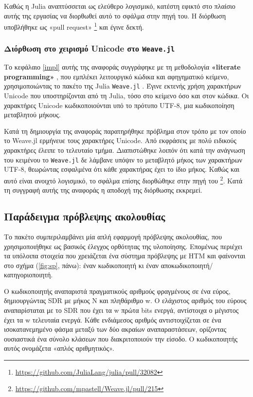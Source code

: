 	Καθώς η Julia αναπτύσσεται ως ελεύθερο λογισμικό, κατέστη εφικτό στο πλαίσιο αυτής της εργασίας να διορθωθεί αυτό το σφάλμα στην πηγή του.
	Η διόρθωση υποβλήθηκε ως «pull request» \footnote{\url{https://github.com/JuliaLang/julia/pull/32082}} και έγινε δεκτή.

	\subsubsection{Διόρθωση στο χειρισμό Unicode στο \texttt{Weave.jl}}

	Το κεφάλαιο \ref{impl} αυτής της αναφοράς συγγράφηκε με τη μεθοδολογία \textbf{«literate programming»} \parencite{knuthLiterateProgramming1984},
	που εμπλέκει λειτουργικό κώδικα και αφηγηματικό κείμενο,
	χρησιμοποιώντας το πακέτο της Julia \texttt{Weave.jl} \cite{pastellWeaveJlScientific2017}.
	Έγινε εκτενής χρήση χαρακτήρων Unicode που υποστηρίζονται από τη Julia, τόσο στο κείμενο όσο και στον κώδικα.
	Οι χαρακτήρες Unicode κωδικοποιούνται υπό το πρότυπο UTF-8, μια κωδικοποίηση μεταβλητού μήκους.

	Κατά τη δημιουργία της αναφοράς παρατηρήθηκε πρόβλημα στον τρόπο με τον οποίο το Weave.jl ερμήνευε τους χαρακτήρες Unicode.
	Από εκφράσεις με πολύ ειδικούς χαρακτήρες έλειπε το τελευταίο τμήμα.
	Διαπιστώθηκε λοιπόν ότι κατά την ανάγνωση του κειμένου το \texttt{Weave.jl} δε λάμβανε υπόψιν το μεταβλητό μήκος των χαρακτήρων UTF-8,
	θεωρώντας εσφαλμένα ότι κάθε χαρακτήρας έχει το ίδιο μήκος.
	Καθώς και αυτό είναι ανοιχτό λογισμικό, το σφάλμα επίσης διορθώθηκε στην πηγή του
	\footnote{\url{https://github.com/mpastell/Weave.jl/pull/215}}.
	Κατά τη συγγραφή αυτής της αναφοράς η αποδοχή της διόρθωσης εκκρεμεί.


\subsection{Παράδειγμα πρόβλεψης ακολουθίας} \label{conc:intro-tspred}

	Το πακέτο συμπεριλαμβάνει μία απλή εφαρμογή πρόβλεψης ακολουθίας, που χρησιμοποιήθηκε ως βασικός έλεγχος ορθότητας της υλοποίησης.
	Επομένως περιέχει τα υπόλοιπα στοιχεία που χρειάζεται ένα σύστημα πρόβλεψης με HTM και φαίνονται στο σχήμα (\ref{fig:sp}, πάνω):
	έναν κωδικοποιητή κι έναν αποκωδικοποιητή/κατηγοριοποιητή.

	Ο κωδικοποιητής αναπαριστά πραγματικούς αριθμούς φραγμένους σε ένα εύρος, δημιουργώντας SDR με μήκος N και πληθάριθμο w.
	Ο ελάχιστος αριθμός του εύρους αναπαρίσταται με το SDR που έχει τα w πρώτα bits ενεργά, αντίστοιχα ο μέγιστος έχει τα w τελευταία ενεργά.
	Κάθε ενδιάμεσος αριθμός αντιστοιχίζεται σε ένα ισοκατανεμημένο φάσμα μεταξύ των δύο ακραίων αναπαραστάσεων,
	ορίζοντας ουσιαστικά ένα σύνολο κλάσεων που διακριτοποιούν την είσοδο.
	Ο κωδικοποιητής αυτός ονομάζετα «απλός αριθμητικός».

